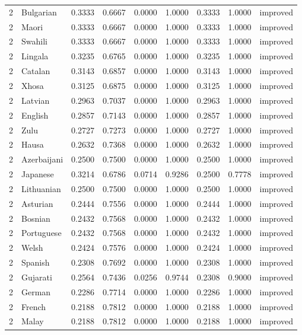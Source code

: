 \begin{tabular}{rlrrrrrrl}
2 & Bulgarian & 0.3333 & 0.6667 & 0.0000 & 1.0000 & 0.3333 & 1.0000 & improved \\
2 & Maori & 0.3333 & 0.6667 & 0.0000 & 1.0000 & 0.3333 & 1.0000 & improved \\
2 & Swahili & 0.3333 & 0.6667 & 0.0000 & 1.0000 & 0.3333 & 1.0000 & improved \\
2 & Lingala & 0.3235 & 0.6765 & 0.0000 & 1.0000 & 0.3235 & 1.0000 & improved \\
2 & Catalan & 0.3143 & 0.6857 & 0.0000 & 1.0000 & 0.3143 & 1.0000 & improved \\
2 & Xhosa & 0.3125 & 0.6875 & 0.0000 & 1.0000 & 0.3125 & 1.0000 & improved \\
2 & Latvian & 0.2963 & 0.7037 & 0.0000 & 1.0000 & 0.2963 & 1.0000 & improved \\
2 & English & 0.2857 & 0.7143 & 0.0000 & 1.0000 & 0.2857 & 1.0000 & improved \\
2 & Zulu & 0.2727 & 0.7273 & 0.0000 & 1.0000 & 0.2727 & 1.0000 & improved \\
2 & Hausa & 0.2632 & 0.7368 & 0.0000 & 1.0000 & 0.2632 & 1.0000 & improved \\
2 & Azerbaijani & 0.2500 & 0.7500 & 0.0000 & 1.0000 & 0.2500 & 1.0000 & improved \\
2 & Japanese & 0.3214 & 0.6786 & 0.0714 & 0.9286 & 0.2500 & 0.7778 & improved \\
2 & Lithuanian & 0.2500 & 0.7500 & 0.0000 & 1.0000 & 0.2500 & 1.0000 & improved \\
2 & Asturian & 0.2444 & 0.7556 & 0.0000 & 1.0000 & 0.2444 & 1.0000 & improved \\
2 & Bosnian & 0.2432 & 0.7568 & 0.0000 & 1.0000 & 0.2432 & 1.0000 & improved \\
2 & Portuguese & 0.2432 & 0.7568 & 0.0000 & 1.0000 & 0.2432 & 1.0000 & improved \\
2 & Welsh & 0.2424 & 0.7576 & 0.0000 & 1.0000 & 0.2424 & 1.0000 & improved \\
2 & Spanish & 0.2308 & 0.7692 & 0.0000 & 1.0000 & 0.2308 & 1.0000 & improved \\
2 & Gujarati & 0.2564 & 0.7436 & 0.0256 & 0.9744 & 0.2308 & 0.9000 & improved \\
2 & German & 0.2286 & 0.7714 & 0.0000 & 1.0000 & 0.2286 & 1.0000 & improved \\
2 & French & 0.2188 & 0.7812 & 0.0000 & 1.0000 & 0.2188 & 1.0000 & improved \\
2 & Malay & 0.2188 & 0.7812 & 0.0000 & 1.0000 & 0.2188 & 1.0000 & improved \\

\end{tabular}
